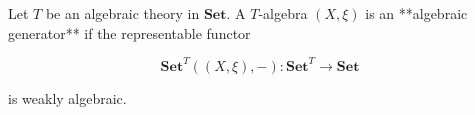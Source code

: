 Let $T$ be an algebraic theory in $\mathbf{Set}$. A $T$-algebra $(X, \xi)$ is an **algebraic generator** if the representable functor

$$\mathbf{Set}^T((X, \xi), -): \mathbf{Set}^T \rightarrow \mathbf{Set}$$

is weakly algebraic.
